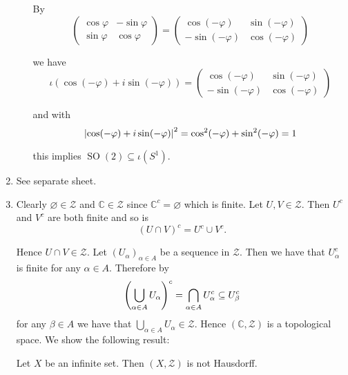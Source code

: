 \begin{enumerate}[label = \textbf{Exercise \arabic*.},wide = 0pt, itemsep=1.5ex]
\begin{enumerate}[label = \alph*),wide = 0pt, itemsep=1.5ex]
	By 
	\begin{equation*}
		\begin{pmatrix}
		\cos \varphi & -\sin \varphi\\
		\sin\varphi & \cos \varphi
	\end{pmatrix} = \begin{pmatrix}
		\cos (-\varphi) & \sin (-\varphi)\\
		-\sin(-\varphi) & \cos (-\varphi)
	\end{pmatrix}
	\end{equation*}

	\noindent we have 
	\begin{equation*}
		\iota(\cos(-\varphi) + i\sin(-\varphi)) = \begin{pmatrix}
		\cos (-\varphi) & \sin (-\varphi)\\
		-\sin(-\varphi) & \cos (-\varphi)
	\end{pmatrix}
	\end{equation*}

	\noindent and with
	\begin{equation*}
		\abs[0]{\cos(-\varphi) + i\sin(-\varphi)}^2 = \cos^2(-\varphi) + \sin^2(-\varphi) = 1 
	\end{equation*}

	\noindent this implies $\operatorname{SO}(2) \subseteq \iota(S^1)$.
	\end{enumerate}
\item See separate sheet.
\item Clearly $\varnothing \in \mathcal{Z}$ and $\mathbb{C} \in \mathcal{Z}$ since $\mathbb{C}^c = \varnothing$ which is finite. Let $U,V \in \mathcal{Z}$. Then $U^c$ and $V^c$ are both finite and so is
	\begin{equation*}
		(U \cap V)^c = U^c \cup V^c.
	\end{equation*}

	Hence $U \cap V \in \mathcal{Z}$. Let $(U_\alpha)_{\alpha \in A}$ be a sequence in $\mathcal{Z}$. Then we have that $U_\alpha^c$ is finite for any $\alpha \in A$. Therefore by
\begin{equation*}
	\del[4]{\bigcup_{\alpha \in A} U_\alpha}^c = \bigcap_{\alpha \in A} U_\alpha^c \subseteq U_{\beta}^c
\end{equation*}
for any $\beta \in A$ we have that $\bigcup_{\alpha \in A}U_\alpha \in \mathcal{Z}$. Hence $(\mathbb{C},\mathcal{Z})$ is a topological space. We show the following result:
\begin{lemma}
	Let $X$ be an infinite set. Then $(X,\mathcal{Z})$ is not Hausdorff.
\end{lemma}


\end{enumerate}
